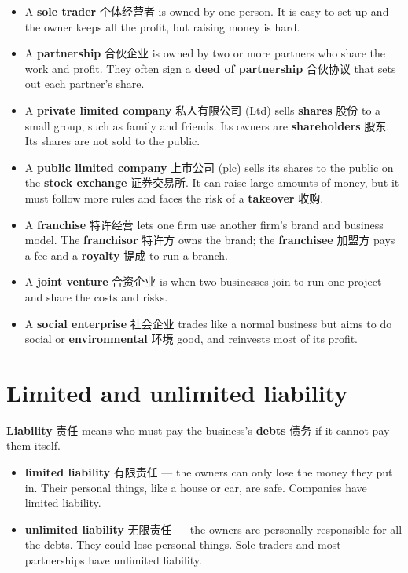 \documentclass[11pt]{article}
\begin{document}
\begin{itemize}
\item A \textbf{sole trader} 个体经营者 is owned by one person. It is easy to set up and the owner keeps all the profit, but raising money is hard.

\item A \textbf{partnership} 合伙企业 is owned by two or more partners who share the work and profit. They often sign a \textbf{deed of partnership} 合伙协议 that sets out each partner's share.

\item A \textbf{private limited company} 私人有限公司 (Ltd) sells \textbf{shares} 股份 to a small group, such as family and friends. Its owners are \textbf{shareholders} 股东. Its shares are not sold to the public.

\item A \textbf{public limited company} 上市公司 (plc) sells its shares to the public on the \textbf{stock exchange} 证券交易所. It can raise large amounts of money, but it must follow more rules and faces the risk of a \textbf{takeover} 收购.

\item A \textbf{franchise} 特许经营 lets one firm use another firm's brand and business model. The \textbf{franchisor} 特许方 owns the brand; the \textbf{franchisee} 加盟方 pays a fee and a \textbf{royalty} 提成 to run a branch.

\item A \textbf{joint venture} 合资企业 is when two businesses join to run one project and share the costs and risks.

\item A \textbf{social enterprise} 社会企业 trades like a normal business but aims to do social or \textbf{environmental} 环境 good, and reinvests most of its profit.

\end{itemize}

\section*{Limited and unlimited liability}

\textbf{Liability} 责任 means who must pay the business's \textbf{debts} 债务 if it cannot pay them itself.

\begin{itemize}
\item \textbf{limited liability} 有限责任 — the owners can only lose the money they put in. Their personal things, like a house or car, are safe. Companies have limited liability.

\item \textbf{unlimited liability} 无限责任 — the owners are personally responsible for all the debts. They could lose personal things. Sole traders and most partnerships have unlimited liability.

\end{itemize}
\end{document}
